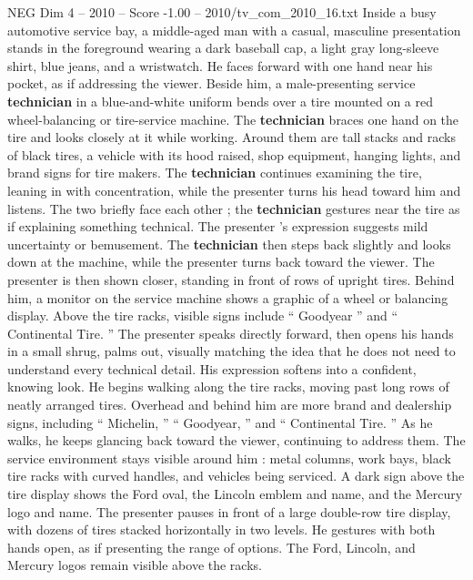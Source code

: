 \begin{textsample}{NEG Dim 4 – 2010 – Score -1.00 – 2010/tv\_com\_2010\_16.txt}  \label{ex:f4_neg_072}
Inside a busy automotive service bay, a middle-aged man with a casual, masculine presentation stands in the foreground wearing a dark baseball cap, a light gray long-sleeve shirt, blue jeans, and a wristwatch.
He faces forward with one hand near his pocket, as if addressing the viewer.
Beside him, a male-presenting service \textbf{technician} in a blue-and-white uniform bends over a tire mounted on a red wheel-balancing or tire-service machine.
The \textbf{technician} braces one hand on the tire and looks closely at it while working.
Around them are tall stacks and racks of black tires, a vehicle with its hood raised, shop equipment, hanging lights, and brand signs for tire makers.
The \textbf{technician} continues examining the tire, leaning in with concentration, while the presenter turns his head toward him and listens.
The two briefly face each other ; the \textbf{technician} gestures near the tire as if explaining something technical.
The presenter ’s expression suggests mild uncertainty or bemusement.
The \textbf{technician} then steps back slightly and looks down at the machine, while the presenter turns back toward the viewer.
The presenter is then shown closer, standing in front of rows of upright tires.
Behind him, a monitor on the service machine shows a graphic of a wheel or balancing display.
Above the tire racks, visible signs include “ Goodyear ” and “ Continental Tire. ” The presenter speaks directly forward, then opens his hands in a small shrug, palms out, visually matching the idea that he does not need to understand every technical detail.
His expression softens into a confident, knowing look.
He begins walking along the tire racks, moving past long rows of neatly arranged tires.
Overhead and behind him are more brand and dealership signs, including “ Michelin, ” “ Goodyear, ” and “ Continental Tire. ” As he walks, he keeps glancing back toward the viewer, continuing to address them.
The service environment stays visible around him : metal columns, work bays, black tire racks with curved handles, and vehicles being serviced.
A dark sign above the tire display shows the Ford oval, the Lincoln emblem and name, and the Mercury logo and name.
The presenter pauses in front of a large double-row tire display, with dozens of tires stacked horizontally in two levels.
He gestures with both hands open, as if presenting the range of options.
The Ford, Lincoln, and Mercury logos remain visible above the racks.

\end{textsample}
